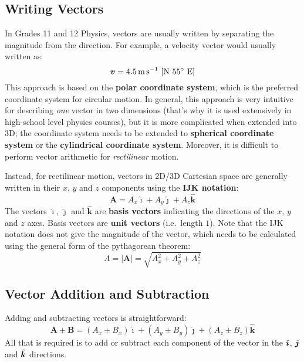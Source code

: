 \documentclass{../../../oss-handout}
\newcommand{\iii}{\ensuremath\hat{\bm{\imath}}}
\newcommand{\jjj}{\ensuremath\hat{\bm{\jmath}}}
\newcommand{\kkk}{\ensuremath\hat{\bm{k}}}
\begin{document}
\subsection{Writing Vectors}
In Grades 11 and 12 Physics, vectors are usually written by separating the
magnitude from the direction. For example, a velocity vector would usually
written as:
\begin{equation*}
  \bm{v}=\SI{4.5}{\metre\per\second}\text{ [N \ang{55} E]}
\end{equation*}
This approach is based on the \textbf{polar coordinate system}, which is the
preferred coordinate system for circular motion. In general, this approach is
very intuitive for describing \emph{one} vector in
two dimensions (that's why it is used extensively in high-school level
physics courses), but it is more complicated when extended into 3D; the
coordinate system needs to be extended to \textbf{spherical coordinate system}
or the \textbf{cylindrical coordinate system}. Moreover, it is difficult to
perform vector arithmetic for \emph{rectilinear} motion.

Instead, for rectilinear motion, vectors in 2D/3D Cartesian space are generally
written in their $x$, $y$ and $z$ components using the \textbf{IJK notation}:
\begin{equation*}
  \bm{A}=A_x\bm{\hat{\imath}} + A_y\bm{\hat{\jmath}} + A_z\bm{\hat{k}}
\end{equation*}
The vectors $\bm{\hat{\imath}}$, $\bm{\hat{\jmath}}$ and $\bm{\hat{k}}$ are
\textbf{basis vectors} indicating the directions of the $x$, $y$ and $z$ axes.
Basis vectors are \textbf{unit vectors} (i.e.\ length $1$). Note that the
IJK notation does not give the magnitude of the vector, which needs to be
calculated using the general form of the pythagorean theorem:
\begin{equation*}
  A=|\bm{A}|=\sqrt{A_x^2 + A_y^2 + A_z^2}
\end{equation*}


\subsection{Vector Addition and Subtraction}

Adding and subtracting vectors is straightforward:
\begin{equation*}
  \bm{A}\pm\bm{B}=
  (A_x\pm B_x)\bm{\hat{\imath}} +
  (A_y\pm B_y)\bm{\hat{\jmath}} +
  (A_z\pm B_z)\bm{\hat{k}}
\end{equation*}
All that is required is to add or subtract each component of the vector in the
$\iii$, $\jjj$ and $\kkk$ directions.
\end{document}

